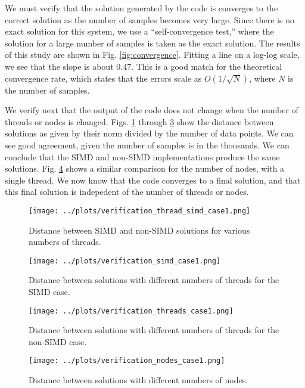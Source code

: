 \documentclass{article}
\begin{document}
We must verify that the solution generated by the code is converges to the correct solution as the number of samples 
becomes very large. Since there is no exact solution for this system, we use a ``self-convergence test,'' where the solution 
for a large number of samples is taken as the exact solution. The results of this study are shown in Fig. \ref{fig:convergence}.
Fitting a line on a log-log scale, we see that the slope is about 0.47. This is a good match for the theoretical 
convergence rate, which states that the errors scale as \(O(1/\sqrt{N})\), where \(N\) is the number of samples. 

We verify next that the output of the code does not change when the number of threads or nodes is changed. 
Figs. \ref{fig:verification-thread-simd-comparison} through \ref{fig:verification-thread-comparison} show the distance
between solutions as given by their norm divided by the number of data points. We can see good agreement, given the 
number of samples is in the thousands. We can conclude that the SIMD and non-SIMD implementations produce the same 
solutions. Fig. \ref{fig:verification-nodes-comparison} shows a similar comparison for the number of nodes, 
with a single thread. We now know that the code converges to a final solution, and that this final solution is
indepedent of the number of threads or nodes.

\begin{figure}
    \centering
    \texttt{[image: ../plots/verification\_thread\_simd\_case1.png]}
    \caption{Distance between SIMD and non-SIMD solutions for various numbers of threads.}
    \label{fig:verification-thread-simd-comparison}
\end{figure}

\begin{figure}
    \centering
    \texttt{[image: ../plots/verification\_simd\_case1.png]}
    \caption{Distance between solutions with different numbers of threads for the SIMD case.}
    \label{fig:verification-simd-comparison}
\end{figure}

\begin{figure}
    \centering
    \texttt{[image: ../plots/verification\_threads\_case1.png]}
    \caption{Distance between solutions with different numbers of threads for the non-SIMD case.}
    \label{fig:verification-thread-comparison}
\end{figure}

\begin{figure}
    \centering
    \texttt{[image: ../plots/verification\_nodes\_case1.png]}
    \caption{Distance between solutions with different numbers of nodes.}
    \label{fig:verification-nodes-comparison}
\end{figure}
\end{document}
